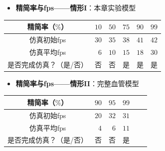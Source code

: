 \begin{frame}
\begin{itemize}
  \item \textbf{精简率与fps——情形I}：本章实验模型
\end{itemize}
\begin{table}[t]
\renewcommand{\arraystretch}{0.5}
\centering
\begin{tabular*}{90mm}{c r r r r r}
\toprule
\hspace{5mm} \small{精简率（$\%$）}           & \small{$10$} & \small{$50$} & \small{$75$} & \small{$90$} & \small{$99$} \\
\midrule
\hspace{5mm} \small{仿真初始fps}              & \small{$30$} & \small{$35$} & \small{$38$} & \small{$41$} & \small{$42$} \\
\midrule
\hspace{5mm} \small{仿真平均fps}              &  \small{$6$} & \small{$10$} & \small{$15$} & \small{$18$} & \small{$30$} \\
\midrule
\hspace{5mm} \small{是否完成仿真？（是/否）}  &  \small{否}  &  \small{否}  & \small{是}   & \small{是}   & \small{是}   \\
\bottomrule
\end{tabular*}
\end{table}
\end{frame}

\begin{frame}
\begin{itemize}
  \item \textbf{精简率与fps——情形II}：完整血管模型
\end{itemize}
\begin{table}[t]
\renewcommand{\arraystretch}{0.5}
\centering
\begin{tabular*}{80mm}{c r r r r r}
\toprule
\hspace{5mm} \small{精简率（$\%$）}           & \small{$90$} & \small{$95$} & \small{$99$} \\
\midrule
\hspace{5mm} \small{仿真初始fps}              & \small{$20$} & \small{$32$} & \small{$31$} \\
\midrule
\hspace{5mm} \small{仿真平均fps}              &  \small{$4$} &  \small{$6$} & \small{$11$} \\
\midrule
\hspace{5mm} \small{是否完成仿真？（是/否）}  &  \small{否}  &  \small{否}  & \small{是}   \\
\bottomrule
\end{tabular*}
\end{table}
\end{frame}


